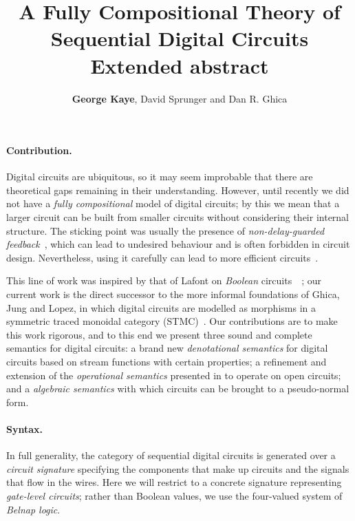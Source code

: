 \documentclass[10pt]{article}
\title{
    \vspace{-3em}
    A Fully Compositional Theory of Sequential Digital Circuits
    \\
    \textbf{Extended abstract}
}
\author{\textbf{George Kaye}, David Sprunger and Dan R. Ghica}
\date{}
\begin{document}
\maketitle

\paragraph*{Contribution.}

Digital circuits are ubiquitous, so it may seem improbable that there are
theoretical gaps remaining in their understanding.
However, until recently we did not have a \emph{fully compositional} model of
digital circuits; by this we mean that a larger circuit can be built from
smaller circuits without considering their internal structure.
The sticking point was usually the presence of
\emph{non-delay-guarded feedback}~\cite{malik1994analysis}, which can lead to
undesired behaviour and is often forbidden in circuit design.
Nevertheless, using it carefully can lead to more
efficient circuits~\cite{riedel2004cyclic,riedel2012cyclic}.

This line of work was inspired by that of Lafont on
\emph{Boolean} circuits~~\cite{lafont2003algebraic}; our current work is the
direct successor to the more informal foundations of Ghica, Jung and Lopez, in
which digital circuits are modelled as morphisms in a symmetric traced
monoidal category (STMC)~\cite{ghica2016categorical,ghica2017diagrammatic}.
Our contributions are to make this work rigorous, and to this end we present
three sound and complete semantics for digital circuits: a brand new
\emph{denotational semantics} for digital circuits based on stream functions
with certain properties; a refinement and extension of the
\emph{operational semantics} presented in \cite{ghica2017diagrammatic} to
operate on open circuits; and a \emph{algebraic semantics} with which circuits
can be brought to a pseudo-normal form.

\paragraph*{Syntax.}

In full generality, the category of sequential digital circuits is generated
over a \emph{circuit signature} specifying the components that make up circuits
and the signals that flow in the wires.
Here we will restrict to a concrete signature
representing \emph{gate-level circuits}; rather than Boolean values, we use the
four-valued system of \emph{Belnap logic}.
\end{document}
